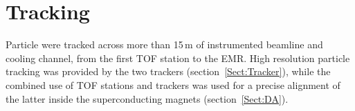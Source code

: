 \section{Tracking}{
\label{Sect:Tracking}

Particle were tracked across more than 15\,m of instrumented beamline and cooling channel, from the first TOF station to the EMR.
High resolution particle tracking was provided by the two trackers (section~\ref{Sect:Tracker}), while the combined use of TOF stations and trackers was used for a precise alignment of the latter inside the superconducting magnets (section~\ref{Sect:DA}).

  \let\section\subsection
  \let\subsection\subsubsection
  \let\subsubsection\paragraph

}
